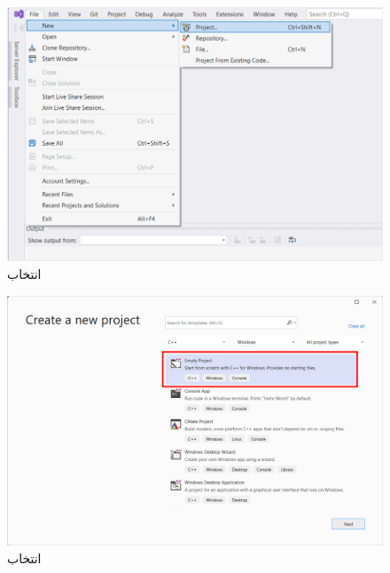 {\begin{spacing}{1.5}
        \begin{figure}[H]
            \centering
            \setlength{\belowcaptionskip}{-10pt}
            \includegraphics[width=\textwidth]{Images/3/3.Intro.5.2}
            \caption{انتخاب }
            \label{fig:3.Intro.5.2}
        \end{figure}

        \begin{figure}[H]
            \centering
            \setlength{\belowcaptionskip}{-10pt}
            \includegraphics[width=\textwidth]{Images/3/3.Intro.5.3}
            \caption{انتخاب }
            \label{fig:3.Intro.5.3}
        \end{figure}


\end{spacing}}
